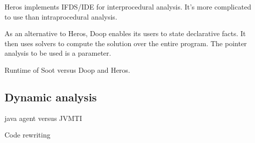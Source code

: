 Heros implements IFDS/IDE for interprocedural analysis.
It's more complicated to use than intraprocedural analysis.

As an alternative to Heros, Doop enables its users to state
declarative facts. It then uses solvers to compute the solution over the
entire program. The pointer analysis to be used is a parameter.

Runtime of Soot versus Doop and Heros.


\subsection{Dynamic analysis}

java agent versus JVMTI

Code rewriting

